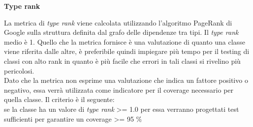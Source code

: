 {\large \textbf{Type rank}\par}
La metrica di \textit{type rank} viene calcolata utilizzando l'algoritmo PageRank di Google sulla struttura definita dal grafo delle dipendenze tra tipi. Il \textit{type rank} medio è 1. Quello che la metrica fornisce è una valutazione di quanto una classe viene riferita dalle altre, è preferibile quindi impiegare più tempo per il testing di classi con alto rank in quanto è più facile che errori in tali classi si rivelino più pericolosi. \\
Dato che la metrica non esprime una valutazione che indica un fattore positivo o negativo, essa verrà utilizzata come indicatore per il coverage necessario per quella classe. Il criterio è il seguente: \\ se la classe ha un valore di \textit{type rank} \textgreater = 1.0 per essa verranno progettati test sufficienti per garantire un coverage \textgreater = 95 \%



